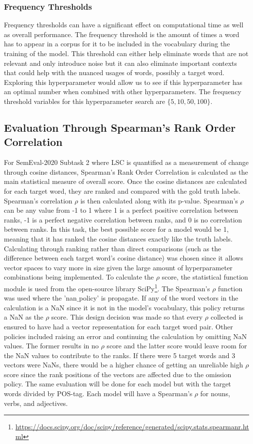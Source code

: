 \subsubsection{Frequency Thresholds}
Frequency thresholds can have a significant effect on computational time as well as overall performance. The frequency threshold is the amount of times a word has to appear in a corpus for it to be included in the vocabulary during the training of the model. This threshold can either help eliminate words that are not relevant and only introduce noise but it can also eliminate important contexts that could help with the nuanced usages of words, possibly a target word. Exploring this hyperparameter would allow us to see if this hyperparameter has an optimal number when combined with other hyperparameters. The frequency threshold variables for this hyperparameter search are $\{5, 10, 50, 100\}$.

\subsection{Evaluation Through Spearman's Rank Order Correlation}
For SemEval-2020 Subtask 2 where LSC is quantified as a measurement of change through cosine distances, Spearman’s Rank Order Correlation is calculated as the main statistical measure of overall score. Once the cosine distances are calculated for each target word, they are ranked and compared with the gold truth labels. Spearman's correlation $\rho$ is then calculated along with its p-value. Spearman’s $\rho$ can be any value from -1 to 1 where 1 is a perfect positive correlation between ranks, -1 is a perfect negative correlation between ranks, and 0 is no correlation between ranks. In this task, the best possible score for a model would be 1, meaning that it has ranked the cosine distances exactly like the truth labels. Calculating through ranking rather than direct comparisons (such as the difference between each target word’s cosine distance) was chosen since it allows vector spaces to vary more in size given the large amount of hyperparameter combinations being implemented.  To calculate the $\rho$ score, the statistical function module is used from the open-source library SciPy\footnote{\url{https://docs.scipy.org/doc/scipy/reference/generated/scipy.stats.spearmanr.html}}. The Spearman's $\rho$ function was used where the 'nan$\_$policy' is propagate. If any of the word vectors in the calculation is a NaN since it is not in the model's vocabulary, this policy returns a NaN as the $\rho$ score. This design decision was made so that every $\rho$ collected is ensured to have had a vector representation for each target word pair. Other policies included raising an error and continuing the calculation by omitting NaN values. The former results in no $\rho$ score and the latter score would leave room for the NaN values to contribute to the ranks. If there were 5 target words and 3 vectors were NaNs, there would be a higher chance of getting an unreliable high $\rho$ score since the rank positions of the vectors are affected due to the omission policy. The same evaluation will be done for each model but with the target words divided by POS-tag. Each model will have a Spearman’s $\rho$ for nouns, verbs, and adjectives. 


